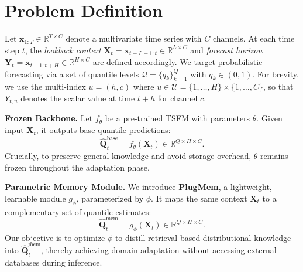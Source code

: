\section{Problem Definition}
\label{sec:setup}


Let $\mathbf{x}_{1:T} \in \mathbb{R}^{T \times C}$ denote a multivariate time series with $C$ channels. At each time step $t$, the \emph{lookback context} $\mathbf{X}_t = \mathbf{x}_{t-L+1:t} \in \mathbb{R}^{L \times C}$ and \emph{forecast horizon} $\mathbf{Y}_t = \mathbf{x}_{t+1:t+H} \in \mathbb{R}^{H \times C}$ are defined accordingly. We target probabilistic forecasting via a set of quantile levels $\mathcal{Q}=\{q_k\}_{k=1}^Q$ with $q_k\in(0,1)$. For brevity, we use the multi-index $u=(h,c)$ where $u \in \mathcal{U} = \{1,\dots,H\} \times \{1,\dots,C\}$, so that $Y_{t,u}$ denotes the scalar value at time $t+h$ for channel $c$.

\noindent\textbf{Frozen Backbone.}
Let $f_{\theta}$ be a pre-trained TSFM with parameters $\theta$.
Given input $\mathbf{X}_t$, it outputs base quantile predictions:
\begin{equation}
    \widehat{\mathbf{Q}}^{\text{base}}_t = f_{\theta}(\mathbf{X}_t) \in \mathbb{R}^{Q \times H \times C}.
    \label{eq:tsm-base-quantile}
\end{equation}
Crucially, to preserve general knowledge and avoid storage overhead, $\theta$ remains frozen throughout the adaptation phase.

\noindent\textbf{Parametric Memory Module.}
We introduce \textbf{PlugMem}, a lightweight, learnable module $g_{\phi}$, parameterized by $\phi$.
It maps the same context $\mathbf{X}_t$ to a complementary set of quantile estimates:
\begin{equation}
    \widehat{\mathbf{Q}}^{\text{mem}}_t = g_{\phi}(\mathbf{X}_t) \in \mathbb{R}^{Q \times H \times C}.
    \label{eq:tsm-mem-quantile}
\end{equation}
Our objective is to optimize $\phi$ to distill retrieval-based distributional knowledge into $\widehat{\mathbf{Q}}^{\text{mem}}_t$, thereby achieving domain adaptation without accessing external databases during inference.
